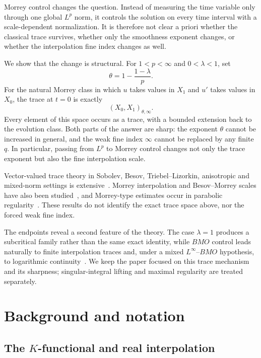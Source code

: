 \documentclass[smallextended,envcountsect,envcountsame]{svjour3}
\begin{document}
Morrey control changes the question. Instead of measuring the time variable only through one global $L^p$ norm, it controls the solution on every time interval with a scale-dependent normalization. It is therefore not clear a priori whether the classical trace survives, whether only the smoothness exponent changes, or whether the interpolation fine index changes as well.

We show that the change is structural. For $1<p<\infty$ and $0<\lambda<1$, set
\[
\theta=1-\frac{1-\lambda}{p}.
\]
For the natural Morrey class in which $u$ takes values in $X_1$ and $u'$ takes values in $X_0$, the trace at $t=0$ is exactly
\[
(X_0,X_1)_{\theta,\infty}.
\]
Every element of this space occurs as a trace, with a bounded extension back to the evolution class. Both parts of the answer are sharp: the exponent $\theta$ cannot be increased in general, and the weak fine index $\infty$ cannot be replaced by any finite $q$. In particular, passing from $L^p$ to Morrey control changes not only the trace exponent but also the fine interpolation scale.

Vector-valued trace theory in Sobolev, Besov, Triebel--Lizorkin, anisotropic and mixed-norm settings is extensive~\cite{Schneider2010,MeyriesVeraar2014,JohnsenSickel2018,AgrestiLindemulderVeraar2023,DenkRoodenburg2026}. Morrey interpolation and Besov--Morrey scales have also been studied~\cite{BurenkovEtAl2010,BurenkovGhorbanalizadehSawano2019,Peetre1969Morrey,Sawano2018}, and Morrey-type estimates occur in parabolic regularity~\cite{OgawaSuguro2023}. These results do not identify the exact trace space above, nor the forced weak fine index.

The endpoints reveal a second feature of the theory. The case $\lambda=1$ produces a subcritical family rather than the same exact identity, while $BMO$ control leads naturally to finite interpolation traces and, under a mixed $L^\infty$--$BMO$ hypothesis, to logarithmic continuity~\cite{JohnNirenberg1961}. We keep the paper focused on this trace mechanism and its sharpness; singular-integral lifting and maximal regularity are treated separately.
\section{Background and notation}\label{sec:background}
	
	\subsection{The \texorpdfstring{$K$}{K}-functional and real interpolation}
	
\end{document}
